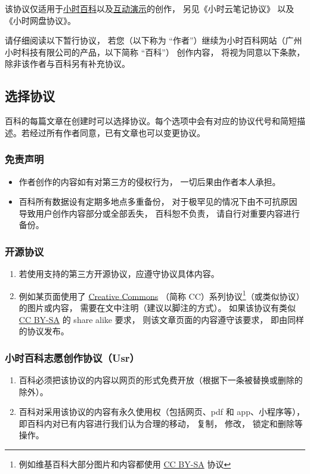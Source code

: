 
该协议仅适用于\href{http://wuli.wiki/online/}{小时百科}以及\href{http://wuli.wiki/apps/}{互动演示}的创作， 另见《小时云笔记协议》 以及《小时网盘协议》。

请仔细阅读以下暂行协议， 若您（以下称为 “作者”）继续为小时百科网站（广州小时科技有限公司的产品，以下简称 “百科”） 创作内容， 将视为同意以下条款， 除非该作者与百科另有补充协议。

\subsection{选择协议}
百科的每篇文章在创建时可以选择协议。每个选项中会有对应的协议代号和简短描述。若经过所有作者同意，已有文章也可以变更协议。

\subsubsection{免责声明}
\begin{itemize}
\item 作者创作的内容如有对第三方的侵权行为， 一切后果由作者本人承担。
\item 百科所有数据设有定期多地点多重备份， 对于极罕见的情况下由不可抗原因导致用户创作内容部分或全部丢失， 百科恕不负责， 请自行对重要内容进行备份。
\end{itemize}

\subsubsection{开源协议}
\begin{enumerate}
\item 若使用支持的第三方开源协议，应遵守协议具体内容。
\item 例如某页面使用了 \href{https://creativecommons.org/licenses/}{Creative Commons} （简称 CC）系列协议\footnote{例如维基百科大部分图片和内容都使用 \href{https://creativecommons.org/licenses/by-sa/3.0/}{CC BY-SA} 协议}（或类似协议）的图片或内容， 需要在文中注明（建议以脚注的方式）。 如果该协议有类似 \href{https://creativecommons.org/licenses/by-sa/3.0/}{CC BY-SA} 的 share alike 要求， 则该文章页面的内容遵守该要求， 即由同样的协议发布。
\end{enumerate}

\subsubsection{小时百科志愿创作协议（Usr）}
\begin{enumerate}
\item 百科必须把该协议的内容以网页的形式免费开放（根据下一条被替换或删除的除外）。
\item 百科对采用该协议的内容有永久使用权（包括网页、pdf 和 app、小程序等）， 即百科内对已有内容进行我们认为合理的移动， 复制， 修改， 锁定和删除等操作。
\end{enumerate}

